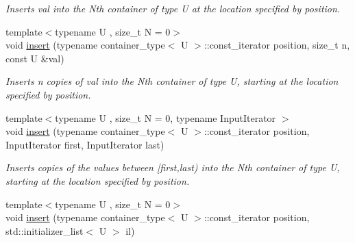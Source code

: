 \begin{DoxyCompactItemize}
\begin{DoxyCompactList}\small\item\em Inserts val into the Nth container of type U at the location specified by position. \end{DoxyCompactList}\item 
\hypertarget{classheterogeneous_1_1heterolist_3_01_t_00_01_types_8_8_8_4_adbf5a65b373c15152eae730a0153e9cc}{}{\footnotesize template$<$typename U , size\+\_\+t N = 0$>$ }\\void \hyperlink{classheterogeneous_1_1heterolist_3_01_t_00_01_types_8_8_8_4_adbf5a65b373c15152eae730a0153e9cc}{insert} (typename container\+\_\+type$<$ U $>$\+::const\+\_\+iterator position, size\+\_\+t n, const U \&val)\label{classheterogeneous_1_1heterolist_3_01_t_00_01_types_8_8_8_4_adbf5a65b373c15152eae730a0153e9cc}

\begin{DoxyCompactList}\small\item\em Inserts n copies of val into the Nth container of type U, starting at the location specified by position. \end{DoxyCompactList}\item 
\hypertarget{classheterogeneous_1_1heterolist_3_01_t_00_01_types_8_8_8_4_a772e4421ce93c048f59b76c2600779a1}{}{\footnotesize template$<$typename U , size\+\_\+t N = 0, typename Input\+Iterator $>$ }\\void \hyperlink{classheterogeneous_1_1heterolist_3_01_t_00_01_types_8_8_8_4_a772e4421ce93c048f59b76c2600779a1}{insert} (typename container\+\_\+type$<$ U $>$\+::const\+\_\+iterator position, Input\+Iterator first, Input\+Iterator last)\label{classheterogeneous_1_1heterolist_3_01_t_00_01_types_8_8_8_4_a772e4421ce93c048f59b76c2600779a1}

\begin{DoxyCompactList}\small\item\em Inserts copies of the values between \mbox{[}first,last) into the Nth container of type U, starting at the location specified by position. \end{DoxyCompactList}\item 
\hypertarget{classheterogeneous_1_1heterolist_3_01_t_00_01_types_8_8_8_4_adcfe0460528e83003b6349f2056a43e6}{}{\footnotesize template$<$typename U , size\+\_\+t N = 0$>$ }\\void \hyperlink{classheterogeneous_1_1heterolist_3_01_t_00_01_types_8_8_8_4_adcfe0460528e83003b6349f2056a43e6}{insert} (typename container\+\_\+type$<$ U $>$\+::const\+\_\+iterator position, std\+::initializer\+\_\+list$<$ U $>$ il)\label{classheterogeneous_1_1heterolist_3_01_t_00_01_types_8_8_8_4_adcfe0460528e83003b6349f2056a43e6}


\end{DoxyCompactItemize}
